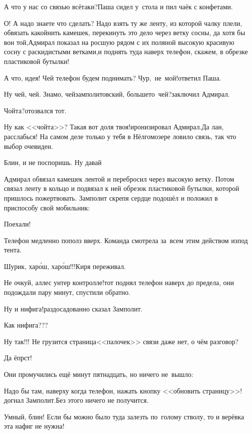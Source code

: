 \diagdash А что у нас со связью всё\sdash таки?\mdash Паша сидел у~стола и пил чаёк с конфетами.

\diagdash О! А надо знаете что сделать? Надо взять ту же ленту, из которой чалку плели, обвязать какой\sdash нить камешек, перекинуть это дело через ветку сосны, да хотя бы вон той,\mdash Адмирал показал на росшую рядом с их поляной высокую красивую сосну с раскидистыми ветками,\mdash и поднять туда наверх телефон, скажем, в обрезке пластиковой бутылки!

\diagdash А что, идея! Чей телефон будем поднимать? Чур,~не~мой!\mdash ответил Паша.

\diagdash Ну чей, чей. Знамо, чей\mdash замполитовский, больше\sdash то~чей?\mdash заключил Адмирал.

\diagdash Чойта?\mdash отозвался тот.

\diagdash Ну как <<чойта>>? Такая вот доля твоя!\mdash иронизировал Адмирал.\mdash Да лан, расслабься! На самом деле только у тебя в Нёлгомозере ловило связь, так что выбор очевиден.

\diagdash Блин, и не поспоришь. Ну давай\myldots{}

Адмирал обвязал камешек лентой и перебросил через высокую ветку. Потом связал ленту в кольцо и подвязал к ней обрезок пластиковой бутылки, которой пришлось пожертвовать. Замполит скрепя сердце подошёл и положил в приспособу свой мобильник:

\diagdash Поехали!

Телефон медленно пополз вверх. Команда смотрела за~всем этим действом из\sdash под тента.

\diagdash Шурик, хар{\'о}ш, хар{\'о}ш!!!\mdash Киря переживал.

\diagdash Не очкуй, аллес унтер контролле!\mdash тот поднял телефон наверх до предела, они подождали пару минут, спустили обратно.

\diagdash Ну и нифига!\mdash раздосадованно сказал Замполит.

\diagdash Как нифига???

\diagdash Ну так!!! Не грузится страница\mdash <<палочек>> связи даже нет, о чём разговор?

\diagdash Да ёпрст!

Они промучились ещё минут пятнадцать, но ничего не~вышло:

\diagdash Надо бы там, наверху когда телефон, нажать кнопку <<обновить страницу>>!\mdash догнал Замполит.\mdash Без этого ничего не получится.

\diagdash Умный, блин! Если бы можно было туда залезть по~голому стволу, то и верёвка эта нафиг не нужна!

